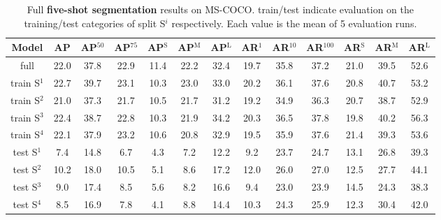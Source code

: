 \documentclass{article}
\newcommand{\coco}{MS-COCO\xspace}
\begin{document}
\begin{table}[h]
\begin{center}
\begin{small}
\begin{tabular}{c|ccc|ccc|ccc|ccc}
Model & AP & AP$^{50}$ & AP$^{75}$ & AP$^\text{S}$ & AP$^\text{M}$ & AP$^\text{L}$ & AR$^{1}$ & AR$^{10}$ & AR$^{100}$ & AR$^\text{S}$ & AR$^\text{M}$ & AR$^\text{L}$\\
\hline
full & 22.0 & 37.8 & 22.9 & 11.4 & 22.2 & 32.4 & 19.7 & 35.8 & 37.2 & 21.0 & 39.5 & 52.6
 \\
\hline
train S$^1$ & 22.7 & 39.7 & 23.1 & 10.3 & 23.0 & 33.0 & 20.2 & 36.1 & 37.6 & 20.8 & 40.7 & 53.2 \\
train S$^2$ & 21.0 & 37.3 & 21.7 & 10.5 & 21.7 & 31.2 & 19.2 & 34.9 & 36.3 & 20.7 & 38.7 & 52.9 \\
train S$^3$ & 22.4 & 38.7 & 22.8 & 10.3 & 21.9 & 34.2 & 20.3 & 36.5 & 37.8 & 19.8 & 40.2 & 56.3 \\
train S$^4$ & 22.1 & 37.9 & 23.2 & 10.6 & 20.8 & 32.9 & 19.5 & 35.9 & 37.6 & 21.4 & 39.3 & 53.6
 \\
\hline
test S$^1$ & 7.4 & 14.8 & 6.7 & 4.3 & 7.2 & 12.2 & 9.2 & 23.7 & 24.7 & 13.1 & 26.8 & 39.3 \\
test S$^2$ & 10.2 & 18.0 & 10.5 & 5.1 & 8.6 & 17.2 & 12.0 & 26.0 & 27.0 & 12.5 & 27.7 & 44.1 \\
test S$^3$ & 9.0 & 17.4 & 8.5 & 5.6 & 8.2 & 16.6 & 9.4 & 23.0 & 23.9 & 14.5 & 24.3 & 38.3 \\
test S$^4$ & 8.5 & 16.9 & 7.8 & 4.1 & 8.8 & 14.4 & 10.3 & 24.3 & 25.9 & 12.3 & 30.4 & 42.0
\end{tabular}
\end{small}
\end{center}
\caption{Full \textbf{five-shot segmentation} results on \coco. train/test indicate evaluation on the training/test categories of split S$^i$ respectively. Each value is the mean of 5 evaluation runs.}
\vspace{-12pt}
\label{table:extended_five-shot_segmentation_results}
\end{table}
\end{document}
